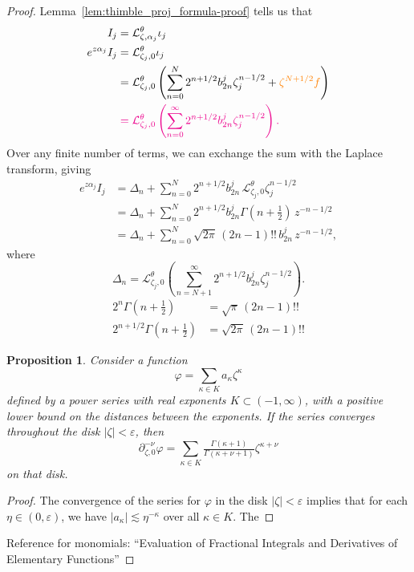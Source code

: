 \documentclass{article}
\newcommand{\laplace}{\mathcal{L}}
\theoremstyle{definition}
\theoremstyle{plain}
\newtheorem{prop}[definition]{Proposition}
\newenvironment{verify}{\color{ForestGreen}}{\color{black}}
\begin{document}
{\begin{proof}
\color{RoyalBlue}
Lemma~\ref{lem:thimble_proj_formula-proof} tells us that
\begin{align*}
I_j & = \laplace_{\zeta, \alpha_j}^\theta \iota_j \\
e^{z\alpha_j} I_j & = \laplace_{\zeta_j, 0}^\theta \iota_j \\
& = \laplace_{\zeta_j, 0}^\theta \left( \sum_{n = 0}^N 2^{n+1/2} b_{2n}^j \zeta_j^{n - 1/2} + \textcolor{orange}{\zeta^{N+1/2} f}\right) \\
& \color{magenta} = \laplace_{\zeta_j, 0}^\theta \left( \sum_{n = 0}^\infty 2^{n+1/2} b_{2n}^j \zeta_j^{n - 1/2} \right).
\end{align*}
Over any finite number of terms, we can exchange the sum with the Laplace transform, giving
\begin{align*}
e^{z\alpha_j} I_j & = \Delta_n + \sum_{n = 0}^N 2^{n+1/2} b_{2n}^j\,\laplace_{\zeta_j, 0}^\theta \zeta_j^{n - 1/2} \\
& = \Delta_n + \sum_{n = 0}^N 2^{n+1/2} b_{2n}^j \Gamma(n + \tfrac{1}{2})\,z^{-n - 1/2} \\
& = \Delta_n + \sum_{n = 0}^N \sqrt{2\pi}\,(2n - 1)!!\,b_{2n}^j\,z^{-n - 1/2},
\end{align*}
where
\[ \Delta_n = \laplace_{\zeta_j, 0}^\theta \left( \sum_{n = N+1}^\infty 2^{n+1/2} b_{2n}^j \zeta_j^{n - 1/2} \right). \]
\begin{verify}
\begin{align*}
2^n \Gamma(n + \tfrac{1}{2}) & = \sqrt{\pi}\,(2n - 1)!! \\
2^{n + 1/2} \Gamma(n + \tfrac{1}{2}) & = \sqrt{2\pi}\,(2n - 1)!!
\end{align*}
\end{verify}

\begin{prop}
Consider a function
\[ \varphi = \sum_{\kappa \in K} a_\kappa \zeta^\kappa \]
defined by a power series with real exponents $K \subset (-1, \infty)$, with a positive lower bound on the distances between the exponents. If the series converges throughout the disk $|\zeta| < \varepsilon$, then
\[ \partial_{\zeta, 0}^{-\nu} \varphi = \sum_{\kappa \in K} \tfrac{\Gamma(\kappa+1)}{\Gamma(\kappa+\nu+1)} \zeta^{\kappa + \nu} \]
on that disk.
\end{prop}
\begin{proof}
The convergence of the series for $\varphi$ in the disk $|\zeta| < \varepsilon$ implies that for each $\eta \in (0, \varepsilon)$, we have $|a_\kappa| \lesssim \eta^{-\kappa}$ over all $\kappa \in K$. The
\end{proof}
\begin{verify}
Reference for monomials: ``Evaluation of Fractional Integrals and Derivatives of Elementary Functions''


\end{verify}
\end{proof}}
\end{document}
